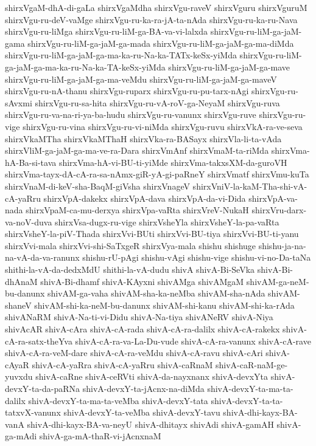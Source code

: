 {shirxVgaM-dhA-di-gaLa
shirxVgaMdha
shirxVgu-raveV
shirxVguru
shirxVguruM
shirxVgu-ru-deV-vaMge
shirxVgu-ru-ka-ra-jA-ta-nAda
shirxVgu-ru-ka-ru-Nava
shirxVgu-ru-liMga
shirxVgu-ru-liM-ga-BA-va-vi-lalxda
shirxVgu-ru-liM-ga-jaM-gama
shirxVgu-ru-liM-ga-jaM-ga-mada
shirxVgu-ru-liM-ga-jaM-ga-ma-diMda
shirxVgu-ru-liM-ga-jaM-ga-ma-ka-ru-Na-ka-TATx-keSx-yiMda
shirxVgu-ru-liM-ga-jaM-ga-ma-ka-ru-Na-ka-TA-keSx-yiMda
shirxVgu-ru-liM-ga-jaM-ga-mave
shirxVgu-ru-liM-ga-jaM-ga-ma-veMdu
shirxVgu-ru-liM-ga-jaM-ga-maveV
shirxVgu-ru-nA-thanu
shirxVgu-ruparx
shirxVgu-ru-pu-tarx-nAgi
shirxVgu-ru-sAvxmi
shirxVgu-ru-sa-hita
shirxVgu-ru-vA-roV-ga-NeyaM
shirxVgu-ruva
shirxVgu-ru-va-na-ri-ya-ba-hudu
shirxVgu-ru-vanunx
shirxVgu-ruve
shirxVgu-ru-vige
shirxVgu-ru-vina
shirxVgu-ru-vi-niMda
shirxVgu-ruvu
shirxVkA-ra-ve-seva
shirxVkaMTha
shirxVkaMThaH
shirxVka-ra-BASayx
shirxVla-li-ta-vAda
shirxVliM-ga-jaM-ga-ma-ve-ra-Dara
shirxVmAnf
shirxVmaM-ta-riMda
shirxVma-hA-Ba-si-tava
shirxVma-hA-vi-BU-ti-yiMde
shirxVma-takxsXM-da-guroVH
shirxVma-tayx-dA-cA-ra-sa-nAmx-giR-yA-gi-paRneY
shirxVmatf
shirxVmu-kuTa
shirxVnaM-di-keV-sha-BaqM-giVsha
shirxVnageV
shirxVniV-la-kaM-Tha-shi-vA-cA-yaRru
shirxVpA-dakekx
shirxVpA-dava
shirxVpA-da-vi-Dida
shirxVpA-va-nada
shirxVpaM-ca-mu-derxya
shirxVpa-vaRta
shirxVreV-NukaH
shirxVru-darx-va-noV-duva
shirxVsa-dugx-ru-vige
shirxVsheYla
shirxVsheY-la-pa-vaRta
shirxVsheY-la-piV-Thada
shirxVvi-BUti
shirxVvi-BU-tiya
shirxVvi-BU-ti-yanu
shirxVvi-mala
shirxVvi-shi-SaTxgeR
shirxVya-mala
shishu
shishuge
shishu-ja-na-na-vA-da-va-ranunx
shishu-rU-pAgi
shishu-vAgi
shishu-vige
shishu-vi-no-Da-taNa
shithi-la-vA-da-dedxMdU
shithi-la-vA-dudu
shivA
shivA-Bi-SeVka
shivA-Bi-dhAnaM
shivA-Bi-dhamf
shivA-KAyxni
shivAMga
shivAMgaM
shivAM-ga-neM-bu-danunx
shivAM-ga-vaha
shivAM-sha-ka-neMba
shivAM-sha-nAda
shivAM-shaneV
shivAM-shi-ka-neM-bu-danunx
shivAM-shi-kanu
shivAM-shi-ka-rAda
shivANaRM
shivA-Na-ti-vi-Didu
shivA-Na-tiya
shivANeRV
shivA-Niya
shivAcAR
shivA-cAra
shivA-cA-rada
shivA-cA-ra-dalilx
shivA-cA-rakekx
shivA-cA-ra-satx-theYva
shivA-cA-ra-va-La-Du-vude
shivA-cA-ra-vanunx
shivA-cA-rave
shivA-cA-ra-veM-dare
shivA-cA-ra-veMdu
shivA-cA-ravu
shivA-cAri
shivA-cAyaR
shivA-cA-yaRra
shivA-cA-yaRru
shivA-caRnaM
shivA-caR-naM-ge-yuvxdu
shivA-caRne
shivA-ceRVti
shivA-da-nayxnanx
shivA-devxYta
shivA-devxY-ta-da-paRNa
shivA-devxY-ta-jAcnx-na-diMda
shivA-devxY-ta-ma-ta-dalilx
shivA-devxY-ta-ma-ta-veMba
shivA-devxY-tata
shivA-devxY-ta-ta-tatxvX-vanunx
shivA-devxY-ta-veMba
shivA-devxY-tavu
shivA-dhi-kayx-BA-vanA
shivA-dhi-kayx-BA-va-neyU
shivA-dhitayx
shivAdi
shivA-gamAH
shivA-ga-mAdi
shivA-ga-mA-thaR-vi-jAcnxnaM
}
